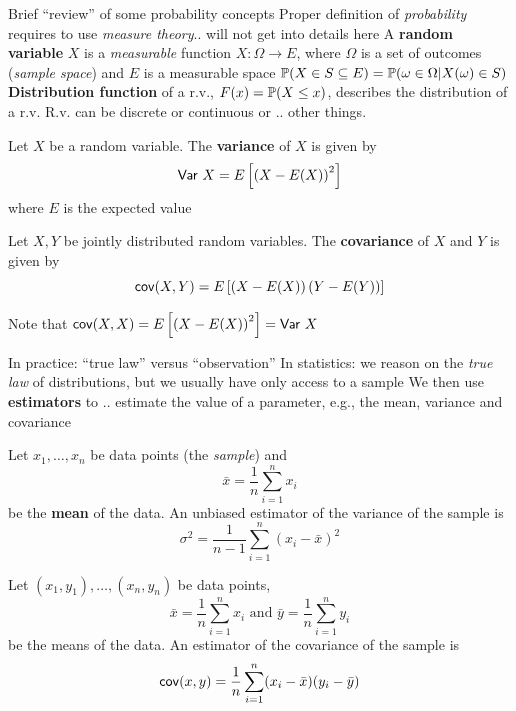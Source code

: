 \documentclass[aspectratio=169]{beamer}\usepackage[]{graphicx}\usepackage[]{xcolor}
\begin{document}
\begin{frame}{Brief ``review'' of some probability concepts}
Proper definition of \emph{probability} requires to use \emph{measure theory}.. will not get into details here
\vfill
A \textbf{random variable} $X$ is a \emph{measurable} function $X:\Omega\to E$, where $\Omega$ is a set of outcomes (\emph{sample space}) and $E$ is a measurable space
\vfill
$\mathbb{P}(X\in S\subseteq E) = \mathbb{P}(\omega\in\Omega|X(\omega)\in S)$
\vfill
\textbf{Distribution function} of a r.v., $F(x)=\mathbb{P}(X\leq x)$, describes the distribution of a r.v.
\vfill
R.v. can be discrete or continuous or .. other things. 
\end{frame}

\begin{frame}
\begin{definition}[Variance]
Let $X$ be a random variable. The \textbf{variance} of $X$ is given by
\[
\mathsf{Var}\  X = E\left[\left(X-E(X)\right)^2\right]
\]
where $E$ is the expected value
\end{definition}
\vfill
\begin{definition}[Covariance]
Let $X,Y$ be jointly distributed random variables. The \textbf{covariance} of $X$ and $Y$ is given by
\[
\mathsf{cov} (X,Y) = E\left[\left(X-E(X)\right)\left(Y-E(Y)\right)\right]
\]
\end{definition}
\vfill
Note that $\mathsf{cov}(X,X)=E\left[\left(X-E(X)\right)^2\right] = \mathsf{Var}\  X$
\end{frame}

\begin{frame}{In practice: ``true law'' versus ``observation''}
In statistics: we reason on the \emph{true law} of distributions, but we usually have only access to a sample
\vfill
We then use \textbf{estimators} to .. estimate the value of a parameter, e.g., the mean, variance and covariance
\vfill
\end{frame}
    
\begin{frame}
\begin{definition}
Let $x_1,\ldots,x_n$ be data points (the \emph{sample}) and 
\[
\bar x = \frac 1n \sum_{i=1}^n x_i
\]
be the \textbf{mean} of the data. An unbiased estimator of the variance of the sample is
\[
\sigma^2 = \frac{1}{n-1}\sum_{i=1}^n (x_i-\bar x)^2
\]
\end{definition}
\end{frame}

\begin{frame}
\begin{definition}
Let $(x_1,y_1),\ldots,(x_n,y_n)$ be data points,
\[
\bar x = \frac 1n \sum_{i=1}^n x_i
\textrm{ and }
\bar y = \frac 1n \sum_{i=1}^n y_i
\]
be the means of the data. An estimator of the covariance of the sample is
\[
\mathsf{cov}(x,y) = \frac{1}{n}\sum_{i=1}^n (x_i-\bar x)(y_i-\bar y)
\]
\end{definition}
\end{frame}
\end{document}
